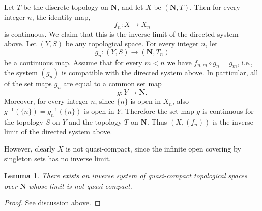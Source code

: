 \documentclass[10pt,a4paper]{amsart}
\theoremstyle{plain}
\newtheorem{lemma}[subsection]{Lemma}
\theoremstyle{definition}
\theoremstyle{remark}
\numberwithin{equation}{subsection}
\begin{document}
\medskip\noindent
Let $T$ be the discrete topology on $\mathbf{N}$, and let $X$ be
$(\mathbf{N}, T)$. Then for every integer $n$, the identity map,
$$
f_n : X \longrightarrow X_n
$$
is continuous. We claim that this is the inverse limit of the directed
system above. Let $(Y, S)$ be any topological space. For every integer $n$,
let
$$
g_n : (Y, S) \longrightarrow (\mathbf{N}, T_n)
$$
be a continuous map. Assume that for every $m < n$ we have
$f_{n,m} \circ g_n = g_m$, i.e., the system $(g_n)$ is compatible
with the directed system above. In particular, all of the set maps
$g_n$ are equal to a common set map
$$
g : Y \longrightarrow \mathbf{N}.
$$
Moreover, for every integer $n$, since $\{n\}$ is open in $X_n$,
also $g^{-1}(\{n\}) = g_n^{-1}(\{n\})$ is open in $Y$.
Therefore the set map $g$ is continuous for the topology $S$ on $Y$
and the topology $T$ on $\mathbf{N}$. Thus $(X, (f_n))$ is the inverse
limit of the directed system above.

\medskip\noindent
However, clearly $X$ is not quasi-compact, since the infinite open
covering by singleton sets has no inverse limit.

\begin{lemma}
\label{lemma-lim-not-quasi-compact}
There exists an inverse system of quasi-compact topological spaces
over $\mathbf{N}$ whose limit is not quasi-compact.
\end{lemma}

\begin{proof}
See discussion above.
\end{proof}
\end{document}
